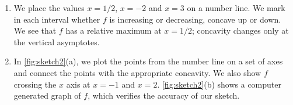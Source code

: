 {\begin{enumerate}
	\item	We place the values $x=1/2$, $x=-2$ and $x=3$ on a number line. We mark in each interval whether $f$ is increasing or decreasing, concave up or down. We see that $f$ has a relative maximum at $x=1/2$; concavity changes only at the vertical asymptotes.

\begin{center}
\end{center}
		
	\item	In \autoref{fig:sketch2}(a), we plot the points from the number line on a set of axes and connect the points with the appropriate concavity. We also show $f$ crossing the $x$ axis at $x=-1$ and $x=2$. \autoref{fig:sketch2}(b) shows a computer generated graph of $f$, which verifies the accuracy of our sketch.\eoehere
\end{enumerate}}

